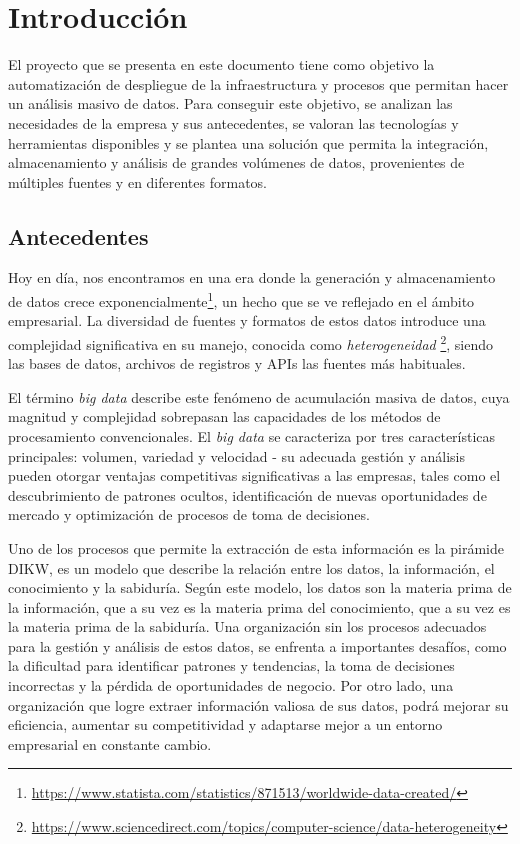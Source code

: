 \chapter{Introducción}\label{chap:intro}
El proyecto que se presenta en este documento tiene como objetivo la automatización de despliegue de la
infraestructura y procesos que permitan hacer un análisis masivo de datos. Para conseguir este objetivo,
se analizan las necesidades de la empresa y sus antecedentes, se valoran las tecnologías y herramientas
disponibles y se plantea una solución que permita la integración, almacenamiento y análisis de grandes
volúmenes de datos, provenientes de múltiples fuentes y en diferentes formatos.

\section{Antecedentes}\label{sec:antecedentes}
Hoy en día, nos encontramos en una era donde la generación y almacenamiento de datos crece
exponencialmente\footnote{\url{https://www.statista.com/statistics/871513/worldwide-data-created/}},
un hecho que se ve reflejado en el ámbito empresarial. La diversidad de fuentes y formatos de
estos datos introduce una complejidad significativa en su manejo, conocida como \textit{heterogeneidad}
\footnote{\url{https://www.sciencedirect.com/topics/computer-science/data-heterogeneity}}, siendo las
bases de datos, archivos de registros y APIs las fuentes más habituales.

El término \textit{big data} describe este fenómeno de acumulación masiva de datos, cuya magnitud y
complejidad sobrepasan las capacidades de los métodos de procesamiento convencionales. El \textit{big data}
se caracteriza por tres características principales: volumen, variedad y velocidad - su adecuada gestión
y análisis pueden otorgar ventajas competitivas significativas a las empresas, tales como el descubrimiento
de patrones ocultos, identificación de nuevas oportunidades de mercado y optimización de procesos de toma
de decisiones.

Uno de los procesos que permite la extracción de esta información es la pirámide DIKW, \cite{enwiki:1211227190}
es un modelo que describe la relación entre los datos, la información, el conocimiento y la sabiduría.
Según este modelo, los datos son la materia prima de la información, que a su vez es la materia prima
del conocimiento, que a su vez es la materia prima de la sabiduría. Una organización sin los procesos
adecuados para la gestión y análisis de estos datos, se enfrenta a importantes desafíos, como la dificultad
para identificar patrones y tendencias, la toma de decisiones incorrectas y la pérdida de oportunidades de
negocio. Por otro lado, una organización que logre extraer información valiosa de sus datos, podrá mejorar su
eficiencia, aumentar su competitividad y adaptarse mejor a un entorno empresarial en constante cambio.


